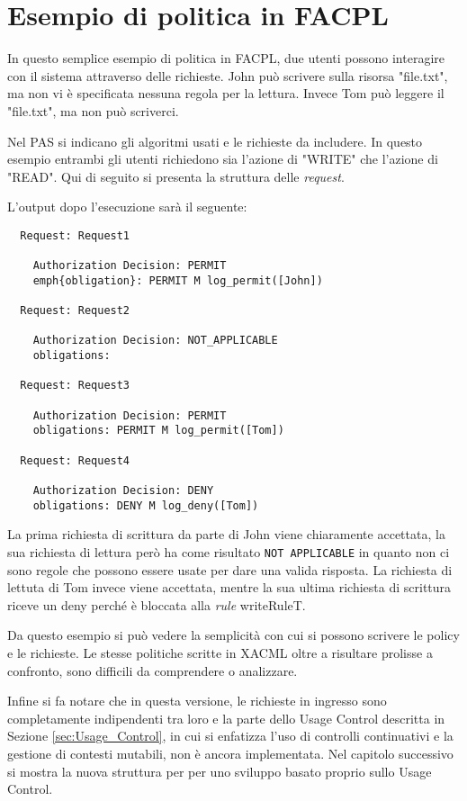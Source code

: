 \section{Esempio di politica in FACPL}
\label{sec:Esempio_FACPL}
In questo semplice esempio di politica in \ac{FACPL}, due utenti possono interagire con il sistema attraverso delle richieste.
John può scrivere sulla risorsa "file.txt", ma non vi è specificata nessuna regola per la lettura. Invece Tom può
leggere il "file.txt", ma non può scriverci.\par

Nel PAS si indicano gli algoritmi usati e le richieste da includere.
In questo esempio entrambi gli utenti richiedono sia l'azione di "WRITE" che l'azione di "READ".
Qui di seguito si presenta la struttura delle \emph{request}.

L'output dopo l'esecuzione sarà il seguente:
\begin{verbatim}
  Request: Request1

    Authorization Decision: PERMIT
    emph{obligation}: PERMIT M log_permit([John])

  Request: Request2

    Authorization Decision: NOT_APPLICABLE
    obligations:

  Request: Request3

    Authorization Decision: PERMIT
    obligations: PERMIT M log_permit([Tom])

  Request: Request4

    Authorization Decision: DENY
    obligations: DENY M log_deny([Tom])
\end{verbatim}
La prima richiesta di scrittura da parte di John viene chiaramente accettata, la sua richiesta di lettura però ha
come risultato \texttt{NOT APPLICABLE} in quanto non ci sono regole che possono essere usate per dare una valida risposta.
La richiesta di lettuta di Tom invece viene accettata, mentre la sua ultima richiesta di scrittura riceve un deny
perché è bloccata alla \emph{rule} writeRuleT.\par
Da questo esempio si può vedere la semplicità con cui si possono scrivere le policy e le richieste.
Le stesse politiche scritte in \ac{XACML} oltre a risultare prolisse a confronto, sono difficili da comprendere o analizzare.\par
Infine si fa notare che in questa versione, le richieste in ingresso sono completamente indipendenti tra loro e
la parte dello Usage Control descritta in Sezione \ref{sec:Usage_Control}, in cui si enfatizza l'uso di controlli continuativi e
la gestione di contesti mutabili, non è ancora implementata. Nel capitolo successivo si mostra la nuova struttura per
per uno sviluppo basato proprio sullo Usage Control.
